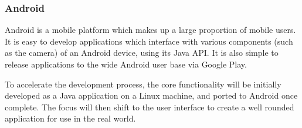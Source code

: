 \subsubsection{Android}

Android\cite{android} is a mobile platform which makes up a large proportion of mobile users. It is easy to develop applications which interface with various components (such as the camera) of an Android device, using its Java\cite{java} API. It is also simple to release applications to the wide Android user base via Google Play\cite{googleplay}.

To accelerate the development process, the core functionality will be initially developed as a Java application on a Linux machine, and ported to Android once complete. The focus will then shift to the user interface to create a well rounded application for use in the real world.